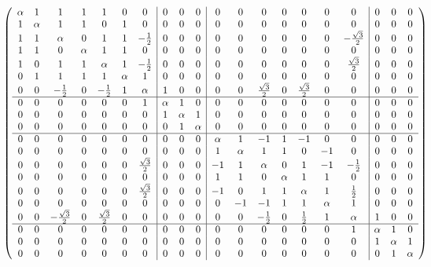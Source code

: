 \[ \hspace{-1cm} 
\left(
\begin{array}{ccccccc|ccc|ccccccc|ccc}
 \alpha  & 1 & 1 & 1 & 1 & 0 & 0 & 0 & 0 & 0 & 0 & 0 & 0 & 0 & 0 & 0 & 0 & 0 & 0 & 0 \\
 1 & \alpha  & 1 & 1 & 0 & 1 & 0 & 0 & 0 & 0 & 0 & 0 & 0 & 0 & 0 & 0 & 0 & 0 & 0 & 0 \\
 1 & 1 & \alpha  & 0 & 1 & 1 & -\frac{1}{2} & 0 & 0 & 0 & 0 & 0 & 0 & 0 & 0 & 0 & -\frac{\sqrt{3}}{2} & 0 & 0 & 0 \\
 1 & 1 & 0 & \alpha  & 1 & 1 & 0 & 0 & 0 & 0 & 0 & 0 & 0 & 0 & 0 & 0 & 0 & 0 & 0 & 0 \\
 1 & 0 & 1 & 1 & \alpha  & 1 & -\frac{1}{2} & 0 & 0 & 0 & 0 & 0 & 0 & 0 & 0 & 0 & \frac{\sqrt{3}}{2} & 0 & 0 & 0 \\
 0 & 1 & 1 & 1 & 1 & \alpha  & 1 & 0 & 0 & 0 & 0 & 0 & 0 & 0 & 0 & 0 & 0 & 0 & 0 & 0 \\
 0 & 0 & -\frac{1}{2} & 0 & -\frac{1}{2} & 1 & \alpha  & 1 & 0 & 0 & 0 & 0 & \frac{\sqrt{3}}{2} & 0 & \frac{\sqrt{3}}{2} & 0 & 0 & 0 & 0 & 0 
 \\  \hline  
 0 & 0 & 0 & 0 & 0 & 0 & 1 & \alpha  & 1 & 0 & 0 & 0 & 0 & 0 & 0 & 0 & 0 & 0 & 0 & 0 
 \\
 0 & 0 & 0 & 0 & 0 & 0 & 0 & 1 & \alpha  & 1 & 0 & 0 & 0 & 0 & 0 & 0 & 0 & 0 & 0 & 0 
 \\
 0 & 0 & 0 & 0 & 0 & 0 & 0 & 0 & 1 & \alpha  & 0 & 0 & 0 & 0 & 0 & 0 & 0 & 0 & 0 & 0 
 \\  \hline 
 0 & 0 & 0 & 0 & 0 & 0 & 0 & 0 & 0 & 0 & \alpha  & 1 & -1 & 1 & -1 & 0 & 0 & 0 & 0 & 0 \\
 0 & 0 & 0 & 0 & 0 & 0 & 0 & 0 & 0 & 0 & 1 & \alpha  & 1 & 1 & 0 & -1 & 0 & 0 & 0 & 0 \\
 0 & 0 & 0 & 0 & 0 & 0 & \frac{\sqrt{3}}{2} & 0 & 0 & 0 & -1 & 1 & \alpha  & 0 & 1 & -1 & -\frac{1}{2} & 0 & 0 & 0 \\
 0 & 0 & 0 & 0 & 0 & 0 & 0 & 0 & 0 & 0 & 1 & 1 & 0 & \alpha  & 1 & 1 & 0 & 0 & 0 & 0 \\
 0 & 0 & 0 & 0 & 0 & 0 & \frac{\sqrt{3}}{2} & 0 & 0 & 0 & -1 & 0 & 1 & 1 & \alpha  & 1 & \frac{1}{2} & 0 & 0 & 0 \\
 0 & 0 & 0 & 0 & 0 & 0 & 0 & 0 & 0 & 0 & 0 & -1 & -1 & 1 & 1 & \alpha  & 1 & 0 & 0 & 0 \\
 0 & 0 & -\frac{\sqrt{3}}{2} & 0 & \frac{\sqrt{3}}{2} & 0 & 0 & 0 & 0 & 0 & 0 & 0 & -\frac{1}{2} & 0 & \frac{1}{2} & 1 & \alpha  & 1 & 0 & 0 
 \\ \hline 
 0 & 0 & 0 & 0 & 0 & 0 & 0 & 0 & 0 & 0 & 0 & 0 & 0 & 0 & 0 & 0 & 1 & \alpha  & 1 & 0 \\
 0 & 0 & 0 & 0 & 0 & 0 & 0 & 0 & 0 & 0 & 0 & 0 & 0 & 0 & 0 & 0 & 0 & 1 & \alpha  & 1 \\
 0 & 0 & 0 & 0 & 0 & 0 & 0 & 0 & 0 & 0 & 0 & 0 & 0 & 0 & 0 & 0 & 0 & 0 & 1 & \alpha  \\
\end{array}
\right)
\]